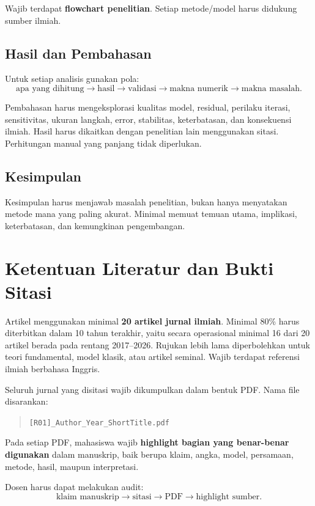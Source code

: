 \documentclass[11pt,a4paper]{article}
\begin{document}
Wajib terdapat \textbf{flowchart penelitian}. Setiap metode/model harus didukung sumber ilmiah.

\subsection{Hasil dan Pembahasan}

Untuk setiap analisis gunakan pola:
\[
\text{apa yang dihitung} \rightarrow \text{hasil} \rightarrow \text{validasi} \rightarrow \text{makna numerik} \rightarrow \text{makna masalah}.
\]

Pembahasan harus mengeksplorasi kualitas model, residual, perilaku iterasi, sensitivitas, ukuran langkah, error, stabilitas, keterbatasan, dan konsekuensi ilmiah. Hasil harus dikaitkan dengan penelitian lain menggunakan sitasi. Perhitungan manual yang panjang tidak diperlukan.

\subsection{Kesimpulan}

Kesimpulan harus menjawab masalah penelitian, bukan hanya menyatakan metode mana yang paling akurat. Minimal memuat temuan utama, implikasi, keterbatasan, dan kemungkinan pengembangan.

\section{Ketentuan Literatur dan Bukti Sitasi}

Artikel menggunakan minimal \textbf{20 artikel jurnal ilmiah}. Minimal 80\% harus diterbitkan dalam 10 tahun terakhir, yaitu secara operasional minimal 16 dari 20 artikel berada pada rentang 2017--2026. Rujukan lebih lama diperbolehkan untuk teori fundamental, model klasik, atau artikel seminal. Wajib terdapat referensi ilmiah berbahasa Inggris.

Seluruh jurnal yang disitasi wajib dikumpulkan dalam bentuk PDF. Nama file disarankan:
\begin{quote}
\texttt{[R01]\_Author\_Year\_ShortTitle.pdf}
\end{quote}

Pada setiap PDF, mahasiswa wajib \textbf{highlight bagian yang benar-benar digunakan} dalam manuskrip, baik berupa klaim, angka, model, persamaan, metode, hasil, maupun interpretasi.

Dosen harus dapat melakukan audit:
\[
\boxed{\text{klaim manuskrip} \rightarrow \text{sitasi} \rightarrow \text{PDF} \rightarrow \text{highlight sumber}.}
\]
\end{document}
